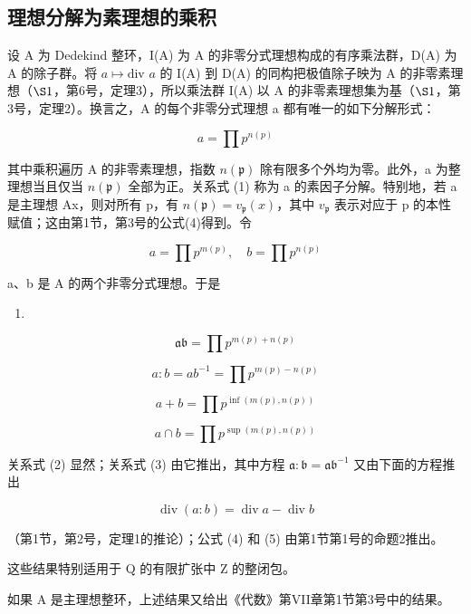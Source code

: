 \subsection{理想分解为素理想的乘积}

设 A 为 Dedekind 整环，I(A) 为 A 的非零分式理想构成的有序乘法群，D(A) 为 A 的除子群。将 \(a \mapsto \text{div } a\) 的 I(A) 到 D(A) 的同构把极值除子映为 A 的非零素理想（\(\S 1\)，第6号，定理3），所以乘法群 I(A) 以 A 的非零素理想集为基（\(\S 1\)，第3号，定理2）。换言之，A 的每个非零分式理想 a 都有唯一的如下分解形式：

\[
a = \prod p ^ {n (p)}\tag{1}
\]

其中乘积遍历 A 的非零素理想，指数 \(n(\mathfrak{p})\) 除有限多个外均为零。此外，a 为整理想当且仅当 \(n(\mathfrak{p})\) 全部为正。关系式 (1) 称为 a 的素因子分解。特别地，若 a 是主理想 Ax，则对所有 p，有 \(n(\mathfrak{p}) = v_{\mathfrak{p}}(x)\)，其中 \(v_{\mathfrak{p}}\) 表示对应于 p 的本性赋值；这由第1节，第3号的公式(4)得到。令

\[
a = \prod p ^ {m (p)}, \quad b = \prod p ^ {n (p)}
\]

a、b 是 A 的两个非零分式理想。于是

\begin{enumerate}
\def\labelenumi{(\arabic{enumi})}
\setcounter{enumi}{1}
\tightlist
\item
\end{enumerate}

\[
\mathfrak {a b} = \prod p ^ {m (p) + n (p)}\tag{3}
\]

\[
a: b = a b ^ {- 1} = \prod p ^ {m (p) - n (p)}\tag{4}
\]

\[
a + b = \prod p ^ {\inf (m (p), n (p))}\tag{5}
\]

\[
a \cap b = \prod p ^ {\sup (m (p), n (p))}
\]

关系式 (2) 显然；关系式 (3) 由它推出，其中方程 \(\mathfrak{a} \colon \mathfrak{b} = \mathfrak{ab}^{-1}\) 又由下面的方程推出

\[
\operatorname{div} (a: b) = \operatorname{div} a - \operatorname{div} b
\]

（第1节，第2号，定理1的推论）；公式 (4) 和 (5) 由第1节第1号的命题2推出。

这些结果特别适用于 Q 的有限扩张中 Z 的整闭包。

如果 A 是主理想整环，上述结果又给出《代数》第VII章第1节第3号中的结果。

